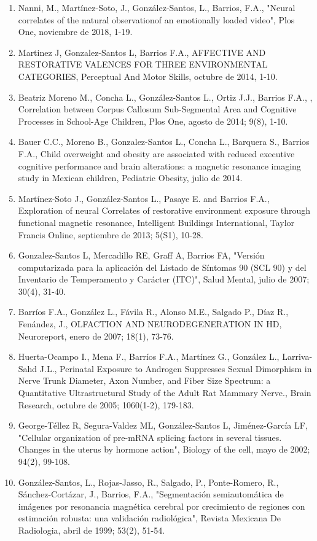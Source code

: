 \documentclass[12pt]{article}
\begin{document}
\begin{enumerate}
\item Nanni, M., Martínez-Soto, J., González-Santos, L., Barrios, F.A., "Neural correlates of the natural observationof an emotionally 
loaded video", Plos One, noviembre de 2018, 1-19.

\item Martinez J, Gonzalez-Santos L, Barrios F.A., AFFECTIVE AND RESTORATIVE VALENCES FOR THREE ENVIRONMENTAL CATEGORIES, Perceptual 
And 
Motor Skills, octubre de 2014, 1-10.

\item Beatriz Moreno M., Concha L., González-Santos L., Ortiz J.J., Barrios F.A., , Correlation between Corpus Callosum Sub-Segmental 
Area 
and Cognitive Processes in School-Age Children, Plos One, agosto de 2014; 9(8), 1-10.

\item Bauer C.C., Moreno B., Gonzalez-Santos L., Concha L., Barquera S., Barrios F.A., Child overweight and obesity are associated with 
reduced executive cognitive performance and brain alterations: a magnetic resonance imaging study in Mexican children, Pediatric 
Obesity, julio de 2014.

\item Martínez-Soto J., González-Santos L., Pasaye E. and Barrios F.A., Exploration of neural Correlates of restorative environment 
exposure through functional magnetic resonance, Intelligent Buildings International, Taylor Francis Online, septiembre de 2013; 5(S1), 
10-28.

\item Gonzalez-Santos L, Mercadillo RE, Graff A, Barrios FA, "Versión computarizada para la aplicación del Listado de Síntomas 90 (SCL 
90) y del Inventario de Temperamento y Carácter (ITC)", Salud Mental, julio de 2007; 30(4), 31-40.

\item Barríos F.A., González L., Fávila R., Alonso M.E., Salgado P., Díaz R., Fenández, J., OLFACTION AND NEURODEGENERATION IN HD, 
Neuroreport, enero de 2007; 18(1), 73-76.

\item Huerta-Ocampo I., Mena F., Barríos F.A., Martínez G., González L., Larriva-Sahd J.L., Perinatal Exposure to Androgen Suppresses 
Sexual Dimorphism in Nerve Trunk Diameter, Axon Number, and Fiber Size Spectrum: a Quantitative Ultrastructural Study of the Adult Rat 
Mammary Nerve., Brain Research, octubre de 2005; 1060(1-2), 179-183.

\item George-Téllez R, Segura-Valdez ML, González-Santos L, Jiménez-García LF, "Cellular organization of pre-mRNA splicing factors in 
several tissues. Changes in the uterus by hormone action", Biology of the cell, mayo de 2002; 94(2), 99-108.

\item González-Santos, L., Rojas-Jasso, R., Salgado, P., Ponte-Romero, R., Sánchez-Cortázar, J., Barrios, F.A., "Segmentación 
semiautomática de imágenes por resonancia magnética cerebral por crecimiento de regiones con estimación robusta: una validación 
radiológica", Revista Mexicana De Radiologia, abril de 1999; 53(2), 51-54.
\end{enumerate}
\end{document}
